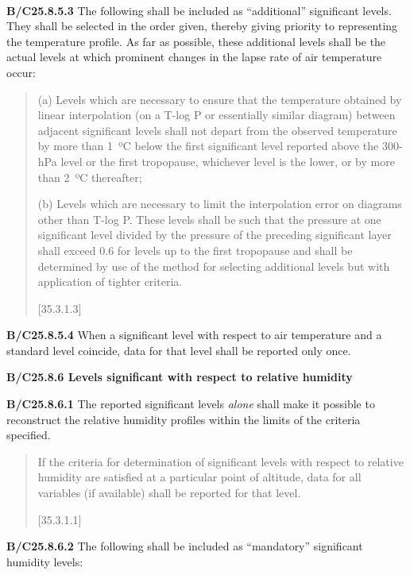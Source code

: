 \textbf{\\
}

\textbf{B/C25.8.5.3} The following shall be included as ``additional'' significant levels. They shall be selected in the order given, thereby giving priority to representing the temperature profile. As far as possible, these additional levels shall be the actual levels at which prominent changes in the lapse rate of air temperature occur:

\begin{quote}
(a) Levels which are necessary to ensure that the temperature obtained by linear interpolation (on a T-log P or essentially similar diagram) between adjacent significant levels shall not depart from the observed temperature by more than 1~ºC below the first significant level reported above the 300-hPa level or the first tropopause, whichever level is the lower, or by more than 2~ºC thereafter;

(b) Levels which are necessary to limit the interpolation error on diagrams other than T-log P. These levels shall be such that the pressure at one significant level divided by the pressure of the preceding significant layer shall exceed 0.6 for levels up to the first tropopause and shall be determined by use of the method for selecting additional levels but with application of tighter criteria.

{[}35.3.1.3{]}
\end{quote}

\textbf{B/C25.8.5.4} When a significant level with respect to air temperature and a standard level coincide, data for that level shall be reported only once.

\textbf{B/C25.8.6 Levels significant with respect to relative humidity}

\textbf{B/C25.8.6.1} The reported significant levels \emph{alone} shall make it possible to reconstruct the relative humidity profiles within the limits of the criteria specified.

\begin{quote}
If the criteria for determination of significant levels with respect to relative humidity are satisfied at a particular point of altitude, data for all variables (if available) shall be reported for that level.

{[}35.3.1.1{]}
\end{quote}

\textbf{B/C25.8.6.2} The following shall be included as ``mandatory'' significant humidity levels:

